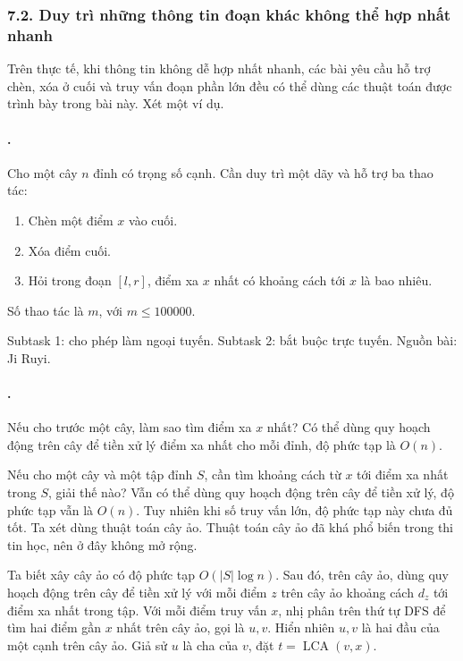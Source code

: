 \documentclass[11pt]{article}
\begin{document}
\subsubsection*{7.2. Duy trì những thông tin đoạn khác không thể hợp nhất nhanh}

Trên thực tế, khi thông tin không dễ hợp nhất nhanh, các bài yêu cầu hỗ trợ
chèn, xóa ở cuối và truy vấn đoạn phần lớn đều có thể dùng các thuật toán được
trình bày trong bài này. Xét một ví dụ.

\paragraph{.}
Cho một cây \(n\) đỉnh có trọng số cạnh. Cần duy trì một dãy và hỗ trợ ba thao
tác:
\begin{enumerate}
  \item Chèn một điểm \(x\) vào cuối.
  \item Xóa điểm cuối.
  \item Hỏi trong đoạn \([l,r]\), điểm xa \(x\) nhất có khoảng cách tới \(x\)
  là bao nhiêu.
\end{enumerate}
Số thao tác là \(m\), với \(m\le 100000\).

Subtask 1: cho phép làm ngoại tuyến. Subtask 2: bắt buộc trực tuyến. Nguồn
bài: Ji Ruyi.

\paragraph{.}
Nếu cho trước một cây, làm sao tìm điểm xa \(x\) nhất? Có thể dùng quy hoạch
động trên cây để tiền xử lý điểm xa nhất cho mỗi đỉnh, độ phức tạp là
\(O(n)\).

Nếu cho một cây và một tập đỉnh \(S\), cần tìm khoảng cách từ \(x\) tới điểm
xa nhất trong \(S\), giải thế nào? Vẫn có thể dùng quy hoạch động trên cây để
tiền xử lý, độ phức tạp vẫn là \(O(n)\). Tuy nhiên khi số truy vấn lớn, độ
phức tạp này chưa đủ tốt. Ta xét dùng thuật toán cây ảo. Thuật toán cây ảo đã
khá phổ biến trong thi tin học, nên ở đây không mở rộng.

Ta biết xây cây ảo có độ phức tạp \(O(|S|\log n)\). Sau đó, trên cây ảo, dùng
quy hoạch động trên cây để tiền xử lý với mỗi điểm \(z\) trên cây ảo khoảng
cách \(d_z\) tới điểm xa nhất trong tập. Với mỗi điểm truy vấn \(x\), nhị phân
trên thứ tự DFS để tìm hai điểm gần \(x\) nhất trên cây ảo, gọi là \(u,v\).
Hiển nhiên \(u,v\) là hai đầu của một cạnh trên cây ảo. Giả sử \(u\) là cha
của \(v\), đặt \(t=\operatorname{LCA}(v,x)\).
\end{document}
